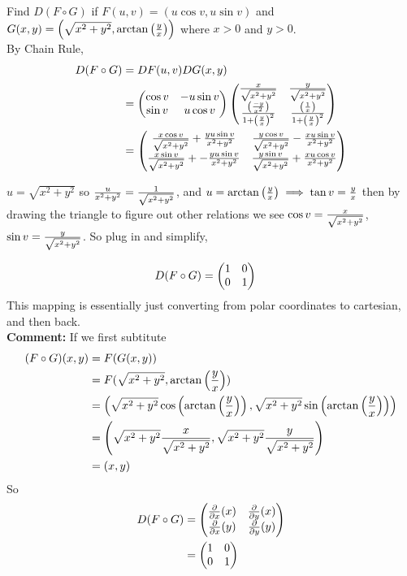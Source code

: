 \documentclass[english, 11pt]{article}
\begin{document}
\begin{exmp}
  Find $D(F \circ G)$ if $F(u,v) = (u\cos v, u\sin v)$ and $G(x,y) = \left( \sqrt{x^2 + y^2}, \arctan \left( \frac{y}{x} \right) \right)$ where $x > 0$ and $y > 0$. \\

  By Chain Rule,
  \begin{align*}
    D(F\circ G) & = DF(u,v) DG(x,y) \\
    & = \left( \begin{matrix} \cos v & -u\sin v \\ \sin v & u\cos v \end{matrix} \right) \left( \begin{matrix} \frac{x}{\sqrt{x^2 + y^2}} & \frac{y}{\sqrt{x^2 + y^2}} \\ \frac{\left( \frac{-y}{x^2} \right)}{1 + \left( \frac{y}{x} \right)^2} & \frac{\left( \frac{1}{x} \right)}{1 + \left( \frac{y}{x} \right)^2} \end{matrix} \right) \\
    & = \left( \begin{matrix} \frac{x\cos v}{\sqrt{x^2 + y^2}} + \frac{yu\sin v}{x^2 + y^2}
              & \frac{y\cos v}{\sqrt{x^2 + y^2}} - \frac{xu\sin v}{x^2 + y^2}
              \\ \frac{x\sin v}{\sqrt{x^2 + y^2}} +-\frac{yu\sin v}{x^2 + y^2}
              & \frac{y\sin v}{\sqrt{x^2 + y^2}} + \frac{xu\cos v}{x^2 + y^2} \end{matrix} \right)
  \end{align*}
  \begin{note}
    $u = \sqrt{x^2 + y^2}$ so $\frac{u}{x^2 + y^2} = \frac{1}{\sqrt{x^2 + y^2}}$, and $u = \arctan \left( \frac{y}{x} \right) \implies \tan v = \frac{y}{x}$ then by drawing the triangle to figure out other relations we see $\cos v = \frac{x}{\sqrt{x^2 + y^2}}$, $\sin v = \frac{y}{\sqrt{x^2 + y^2}}$. So plug in and simplify,
  \end{note}
  \begin{align*}
    D(F \circ G) & = \left( \begin{matrix} 1 & 0 \\ 0 & 1 \end{matrix} \right)
  \end{align*}
  This mapping is essentially just converting from polar coordinates to cartesian, and then back. \\
  \textbf{Comment:} If we first subtitute
  \begin{align*}
    (F \circ G)(x,y) & = F(G(x,y)) \\
    & = F(\sqrt{x^2 + y^2}, \arctan \left( \frac{y}{x} \right)) \\
    & = \left(\sqrt{x^2 + y^2}\cos \left( \arctan \left( \frac{y}{x} \right) \right), \sqrt{x^2 + y^2}\sin \left( \arctan \left( \frac{y}{x} \right) \right) \right) \\
    & = \left( \sqrt{x^2 + y^2} \frac{x}{\sqrt{x^2 + y^2}}, \sqrt{x^2 + y^2} \frac{y}{\sqrt{x^2 + y^2}} \right) \\
    & = (x,y)
  \end{align*}
  So
  \begin{align*}
    D(F\circ G) & = \left( \begin{matrix} \frac{\partial}{\partial x}(x) & \frac{\partial}{\partial y}(x) \\ \frac{\partial}{\partial x}(y) & \frac{\partial}{\partial y}(y) \end{matrix} \right) \\
    & = \left( \begin{matrix} 1 & 0 \\0 & 1 \end{matrix} \right)
  \end{align*}
\end{exmp}
\end{document}
